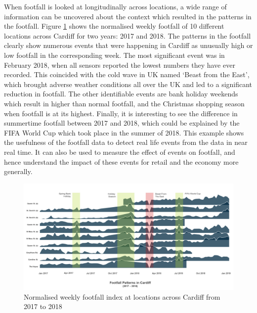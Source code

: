 When footfall is looked at longitudinally across locations, a wide range of information can be uncovered about the context which resulted in the patterns in the footfall. 
Figure \ref{figure:applications:cardiff} shows the normalised weekly footfall of 10 different locations across Cardiff for two years: 2017 and 2018. 
The patterns in the footfall clearly show numerous events that were happening in Cardiff as unusually high or low footfall in the corresponding week. 
The most significant event was in February 2018, when all sensors reported the lowest numbers they have ever recorded. 
This coincided with the cold wave in UK named ‘Beast from the East’, which brought adverse weather conditions all over the UK and led to a significant reduction in footfall. 
The other identifiable events are bank holiday weekends which result in higher than normal footfall, and the Christmas shopping season when footfall is at its highest. 
Finally, it is interesting to see the difference in summertime footfall between 2017 and 2018, which could be explained by the FIFA World Cup which took place in the summer of 2018. 
This example shows the usefulness of the footfall data to detect real life events from the data in near real time. 
It can also be used to measure the effect of events on footfall, and hence understand the impact of these events for retail and the  economy more generally.

\begin{figure}
  \includegraphics[trim={0 50 0 0},clip]{images/applications-cardiff-footfall.png}
  \caption{Normalised weekly footfall index at locations across Cardiff from 2017 to 2018}
  \label{figure:applications:cardiff}
\end{figure}

